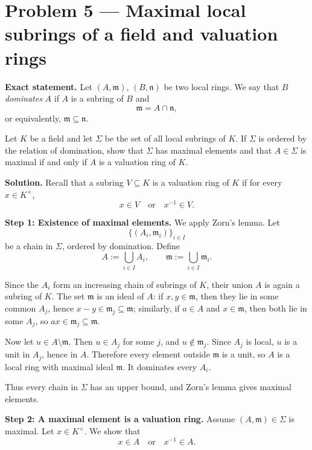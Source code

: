 \documentclass[12pt,a4paper,oneside]{report}
\theoremstyle{notespace}
\begin{document}
\bigskip

\section{Problem 5 --- Maximal local subrings of a field and valuation rings}

\textbf{Exact statement.}
Let \((A,\mathfrak m)\), \((B,\mathfrak n)\) be two local rings. We say that \(B\) \emph{dominates} \(A\) if \(A\) is a subring of \(B\) and
\[
\mathfrak m=A\cap \mathfrak n,
\]
or equivalently, \(\mathfrak m\subseteq \mathfrak n\).

Let \(K\) be a field and let \(\Sigma\) be the set of all local subrings of \(K\). If \(\Sigma\) is ordered by the relation of domination, show that \(\Sigma\) has maximal elements and that \(A\in\Sigma\) is maximal if and only if \(A\) is a valuation ring of \(K\).

\textbf{Solution.}
Recall that a subring \(V\subseteq K\) is a valuation ring of \(K\) if for every \(x\in K^\times\),
\[
x\in V \quad\text{or}\quad x^{-1}\in V.
\]

\textbf{Step 1: Existence of maximal elements.}
We apply Zorn's lemma. Let
\[
\{(A_i,\mathfrak m_i)\}_{i\in I}
\]
be a chain in \(\Sigma\), ordered by domination. Define
\[
A:=\bigcup_{i\in I} A_i,
\qquad
\mathfrak m:=\bigcup_{i\in I}\mathfrak m_i.
\]

Since the \(A_i\) form an increasing chain of subrings of \(K\), their union \(A\) is again a subring of \(K\). The set \(\mathfrak m\) is an ideal of \(A\): if \(x,y\in \mathfrak m\), then they lie in some common \(A_j\), hence \(x-y\in \mathfrak m_j\subseteq \mathfrak m\); similarly, if \(a\in A\) and \(x\in \mathfrak m\), then both lie in some \(A_j\), so \(ax\in \mathfrak m_j\subseteq \mathfrak m\).

Now let \(u\in A\setminus \mathfrak m\). Then \(u\in A_j\) for some \(j\), and \(u\notin \mathfrak m_j\). Since \(A_j\) is local, \(u\) is a unit in \(A_j\), hence in \(A\). Therefore every element outside \(\mathfrak m\) is a unit, so \(A\) is a local ring with maximal ideal \(\mathfrak m\). It dominates every \(A_i\).

Thus every chain in \(\Sigma\) has an upper bound, and Zorn's lemma gives maximal elements.

\medskip

\textbf{Step 2: A maximal element is a valuation ring.}
Assume \((A,\mathfrak m)\in \Sigma\) is maximal. Let \(x\in K^\times\). We show that
\[
x\in A \quad\text{or}\quad x^{-1}\in A.
\]
\end{document}
